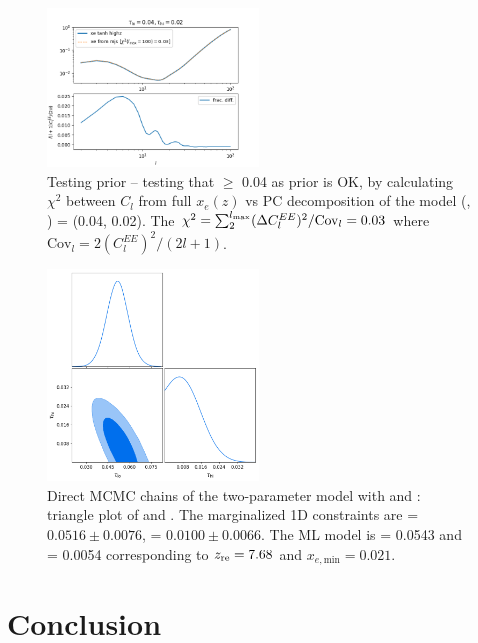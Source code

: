 \documentclass[prd,twocolumn,amsmath,amssymb,floatfix,superscriptaddress,nofootinbib]{revtex4-1}
\begin{document}
\begin{figure}
\includegraphics[width=0.5\textwidth]{results/cosmomc_kde/taulo_prior_test/plot_cls_taulo_0p04_tauhi_0p02.png}
\caption{Testing \taulo prior -- testing that \taulo $\geq$ 0.04 as \taulo prior is OK, by calculating $\chi^2$ between $C_l$ from full $x_e(z)$ vs PC decomposition of the model (\taulo, \tauhi) = (0.04, 0.02). 
The $\chi^2 = \sum_{2}^{l_{\rm max}} (\Delta C_l^{EE})^2 / \mathrm{Cov}_l = 0.03$ where $\mathrm{Cov}_l = 2 (C_l^{EE})^2/(2l+1)$. } 
\label{fig:taulo_prior_test_cl}
\end{figure}



\begin{figure}
\includegraphics[width=0.5\textwidth]{results/direct_mcmc/two_parameter_model/tauhi_taulo_chains/pl18_tanh_highz_test2_run1_tri.png}
\caption{Direct MCMC chains of the two-parameter model with \tauhi and \taulo: triangle plot of \tauhi and \taulo. The marginalized 1D constraints are \taulo = $0.0516 \pm 0.0076$, \tauhi = $0.0100 \pm   0.0066$. The ML model is \taulo = 0.0543 and \tauhi = 0.0054 corresponding to $z_{\rm re} = 7.68$ and $x_{e, \mathrm{min}} = 0.021$.
}
\label{fig:two_parameter_model_2D_plot}
\end{figure}


\section{Conclusion}
\label{sec:conclusion}
\end{document}
